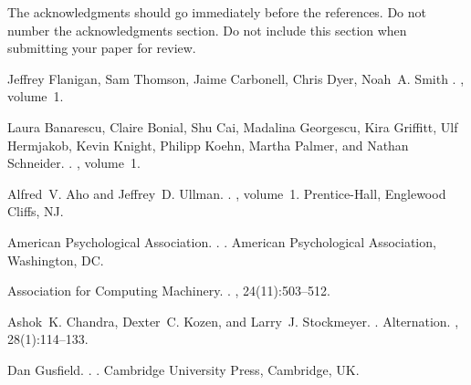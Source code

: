 \documentclass[11pt]{article}
\begin{document}
The acknowledgments should go immediately before the references.  Do
not number the acknowledgments section. Do not include this section
when submitting your paper for review.

%
%

\begin{thebibliography}{}

Jeffrey Flanigan, Sam Thomson, Jaime Carbonell, Chris Dyer, Noah~A. Smith
.
, volume~1.

Laura Banarescu, Claire Bonial, Shu Cai, Madalina Georgescu, Kira Griffitt, Ulf Hermjakob, Kevin Knight, Philipp Koehn, Martha Palmer, and Nathan Schneider.
.
, volume~1.

Alfred~V. Aho and Jeffrey~D. Ullman.
.
, volume~1.
\newblock Prentice-{Hall}, Englewood Cliffs, NJ.

{American Psychological Association}.
.
.
\newblock American Psychological Association, Washington, DC.

{Association for Computing Machinery}.
.
, 24(11):503--512.

Ashok~K. Chandra, Dexter~C. Kozen, and Larry~J. Stockmeyer.
.
\newblock Alternation.
,
  28(1):114--133.

Dan Gusfield.
.
.
\newblock Cambridge University Press, Cambridge, UK.

\end{thebibliography}
\end{document}
